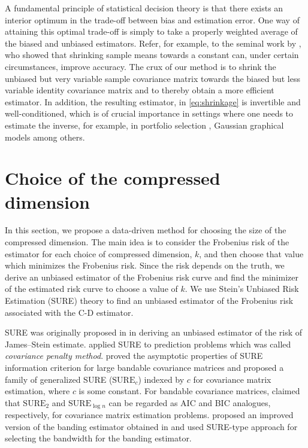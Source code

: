 \documentclass[11pt,oneside]{amsart}
\begin{document}
A fundamental principle of statistical decision theory is that there
exists an interior optimum in the trade-off between bias and estimation error. One way of attaining this optimal trade-off is simply to take
a properly weighted average of the biased and unbiased estimators. Refer, for example, to the seminal work by  \citet{stein1956inadmissibility}, who showed that shrinking sample means towards a constant
can, under certain circumstances, improve accuracy. 
The crux of our method is to shrink the unbiased but very variable sample
covariance matrix towards the biased but less variable identity covariance matrix and
to thereby obtain a more efficient estimator. In addition, the resulting estimator, in \eqref{eq:shrinkage} is invertible
and well-conditioned, which is of crucial importance in settings where one needs to estimate the inverse, for example, in portfolio selection \citep{ledoit2003flexible}, Gaussian graphical models \citep{meinshausen2006high,yuan2007model} among others. 

\section{Choice of the compressed dimension} \label{dimension}
In this section, we propose a data-driven method for choosing the size of the compressed dimension. The main idea is to consider the Frobenius risk of the estimator for each choice of compressed dimension, $k$, and then choose that value which minimizes the Frobenius risk. Since the risk depends on the truth, we derive an unbiased estimator of the Frobenius risk curve and find the minimizer of the estimated risk curve to choose a value of $k$. We use Stein's Unbiased Risk Estimation (SURE) theory to find an unbiased estimator of the Frobenius risk associated with the C-D estimator. 

SURE was originally proposed in \cite{stein1981estimation} in deriving an unbiased estimator of the risk of James--Stein estimate. \citet{efron1986biased,efron2004estimation} applied SURE to prediction problems which was called {\em covariance penalty method}. \citet{li2016sure} proved the asymptotic properties of SURE information criterion for large bandable covariance matrices and proposed a family of generalized SURE ($\mbox{SURE}_{c}$) indexed by $c$ for covariance matrix estimation, where $c$ is some constant. For bandable covariance matrices, \citet{li2014asymptotic} claimed that $\mbox{SURE}_{2}$ and $\mbox{SURE}_{\log{}{n}}$ can be regarded as AIC and BIC analogues, respectively, for covariance matrix estimation problems. \cite{xiao2014theoretic} proposed an improved version of the banding estimator obtained in \cite{bickel2008regularized} and used SURE-type approach for selecting the bandwidth for the banding estimator. 
\end{document}
